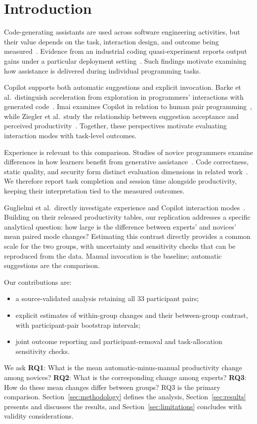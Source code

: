 \section{Introduction}
\label{sec:introduction}
Code-generating assistants are used across software engineering activities,
but their value depends on the task, interaction design, and outcome being
measured~\cite{hou2024slr,sergeyuk2025assistants}. Evidence from an industrial
coding quasi-experiment reports output gains under a particular deployment
setting~\cite{gambacorta2026productivity}. Such findings motivate examining
how assistance is delivered during individual programming tasks.

Copilot supports both automatic suggestions and explicit invocation. Barke
et al.\ distinguish acceleration from exploration in programmers' interactions
with generated code~\cite{barke2023grounded}. Imai examines Copilot in relation
to human pair programming~\cite{imai2022substitute}, while Ziegler et al.\ study
the relationship between suggestion acceptance and perceived
productivity~\cite{ziegler2022productivity}. Together, these perspectives motivate
evaluating interaction modes with task-level outcomes.

Experience is relevant to this comparison. Studies of novice programmers
examine differences in how learners benefit from generative
assistance~\cite{prather2024widening,kosar2024education}. Code correctness,
static quality, and security form distinct evaluation dimensions in related
work~\cite{dakhel2023asset,haindl2024chatgpt,zare2026security}. We therefore
report task completion and session time alongside productivity, keeping their
interpretation tied to the measured outcomes.

Guglielmi et al.\ directly investigate experience and Copilot interaction
modes~\cite{guglielmi2026copilot}. Building on their released productivity
tables, our replication addresses a specific analytical question: how large is
the difference between experts' and novices' mean paired mode changes?
Estimating this contrast directly provides a common scale for the two groups,
with uncertainty and sensitivity checks that can be reproduced from the data.
Manual invocation is the baseline; automatic suggestions are the comparison.

Our contributions are:
\begin{itemize}
  \item a source-validated analysis retaining all 33 participant pairs;
  \item explicit estimates of within-group changes and their between-group
  contrast, with participant-pair bootstrap intervals;
  \item joint outcome reporting and participant-removal and task-allocation
  sensitivity checks.
\end{itemize}
We ask \textbf{RQ1}: What is the mean automatic-minus-manual productivity
change among novices? \textbf{RQ2}: What is the corresponding change among
experts? \textbf{RQ3}: How do these mean changes differ between groups?
RQ3 is the primary comparison. Section~\ref{sec:methodology} defines the
analysis, Section~\ref{sec:results} presents and discusses the results, and
Section~\ref{sec:limitations} concludes with validity considerations.
